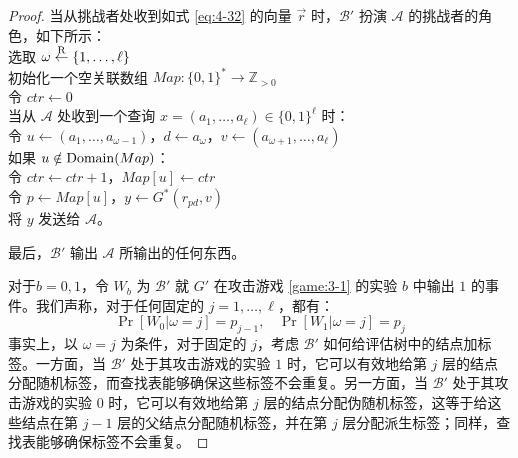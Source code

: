 \begin{proof}
\hspace*{5pt} 当从挑战者处收到如式 \ref{eq:4-32} 的向量 $\vec r$ 时，$\mathcal{B}'$ 扮演 $\mathcal{A}$ 的挑战者的角色，如下所示：\\
\hspace*{50pt} 选取 $\omega\overset{\rm R}\leftarrow\{1,\dots,\ell\}$\\
\hspace*{50pt} 初始化一个空关联数组 $Map:\{0,1\}^*\to\mathbb{Z}_{>0}$\\
\hspace*{50pt} 令 $ctr\leftarrow 0$\\
\hspace*{50pt} 当从 $\mathcal{A}$ 处收到一个查询 $x=(a_1,\dots,a_\ell)\in\{0,1\}^\ell$ 时：\\
\hspace*{75pt} 令 $u\leftarrow(a_1,\dots,a_{\omega-1})$，$d\leftarrow a_\omega$，$v\leftarrow(a_{\omega+1},\dots,a_\ell)$\\
\hspace*{75pt} 如果 $u\notin{\rm Domain}(Map)$：\\
\hspace*{100pt} 令 $ctr\leftarrow ctr+1$，$Map[u]\leftarrow ctr$\\
\hspace*{75pt} 令 $p\leftarrow Map[u]$，$y\leftarrow G^*(r_{pd},v)$\\
\hspace*{75pt} 将 $y$ 发送给 $\mathcal{A}$。

\vspace{3pt}

\hspace*{5pt} 最后，$\mathcal{B}'$ 输出 $\mathcal{A}$ 所输出的任何东西。

\vspace{5pt}

对于$b=0,1$，令 $W_b$ 为 $\mathcal{B}'$ 就 $G'$ 在攻击游戏 \ref{game:3-1} 的实验 $b$ 中输出 $1$ 的事件。我们声称，对于任何固定的 $j=1,\dots,\ell$，都有：
\[
\Pr[W_0|\omega=j]=p_{j-1},~~~~
\Pr[W_1|\omega=j]=p_j
\]
事实上，以 $\omega=j$ 为条件，对于固定的 $j$，考虑 $\mathcal{B}'$ 如何给评估树中的结点加标签。一方面，当 $\mathcal{B}'$ 处于其攻击游戏的实验 $1$ 时，它可以有效地给第 $j$ 层的结点分配随机标签，而查找表能够确保这些标签不会重复。另一方面，当 $\mathcal{B}'$ 处于其攻击游戏的实验 $0$ 时，它可以有效地给第 $j$ 层的结点分配伪随机标签，这等于给这些结点在第 $j-1$ 层的父结点分配随机标签，并在第 $j$ 层分配派生标签；同样，查找表能够确保标签不会重复。


\end{proof}
